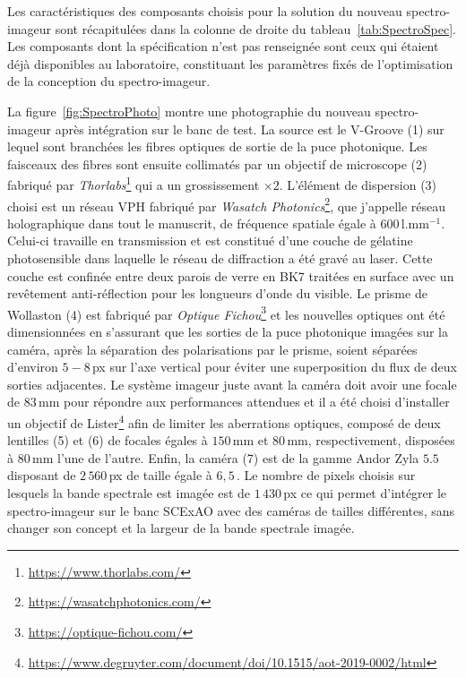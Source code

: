 Les caractéristiques des composants choisis pour la solution du nouveau spectro-imageur sont récapitulées dans la colonne de droite du tableau~\ref{tab:SpectroSpec}. Les composants dont la spécification n'est pas renseignée sont ceux qui étaient déjà disponibles au laboratoire, constituant les paramètres fixés de l'optimisation de la conception du spectro-imageur. 

La figure~\ref{fig:SpectroPhoto} montre une photographie du nouveau spectro-imageur après intégration sur le banc de test. La source est le V-Groove (1) sur lequel sont branchées les fibres optiques de sortie de la puce photonique. Les faisceaux des fibres sont ensuite collimatés par un objectif de microscope (2) fabriqué par \textit{Thorlabs}\footnote{\url{https://www.thorlabs.com/}} qui a un grossissement $\times 2$. L'élément de dispersion (3) choisi est un réseau \ac{VPH} fabriqué par \textit{Wasatch Photonics}\footnote{\url{https://wasatchphotonics.com/}}, que j'appelle réseau holographique dans tout le manuscrit, de fréquence spatiale égale à $600 \,\text{l}.\text{mm}^{-1}$. Celui-ci travaille en transmission et est constitué d'une couche de gélatine photosensible dans laquelle le réseau de diffraction a été gravé au laser. Cette couche est confinée entre deux parois de verre en BK7 traitées en surface avec un revêtement anti-réflection pour les longueurs d'onde du visible. Le prisme de Wollaston (4) est fabriqué par \textit{Optique Fichou}\footnote{\url{https://optique-fichou.com/}} et les nouvelles optiques ont été dimensionnées en s'assurant que les sorties de la puce photonique imagées sur la caméra, après la séparation des polarisations par le prisme, soient séparées d'environ $5 - 8 \,$px sur l'axe vertical pour éviter une superposition du flux de deux sorties adjacentes. Le système imageur juste avant la caméra doit avoir une focale de $83 \,$mm pour répondre aux performances attendues et il a été choisi d'installer un objectif de Lister\footnote{\url{https://www.degruyter.com/document/doi/10.1515/aot-2019-0002/html}} afin de limiter les aberrations optiques, composé de deux lentilles (5) et (6) de focales égales à $150 \,$mm et $80 \,$mm, respectivement, disposées à $80 \,$mm l'une de l'autre. Enfin, la caméra (7) est de la gamme Andor Zyla $5.5$ disposant de $2\,560 \,$px de taille égale à $6,5 \,$\um. Le nombre de pixels choisis sur lesquels la bande spectrale est imagée est de $1\,430 \,$px ce qui permet d'intégrer le spectro-imageur sur le banc \ac{SCExAO} avec des caméras de tailles différentes, sans changer son concept et la largeur de la bande spectrale imagée.

